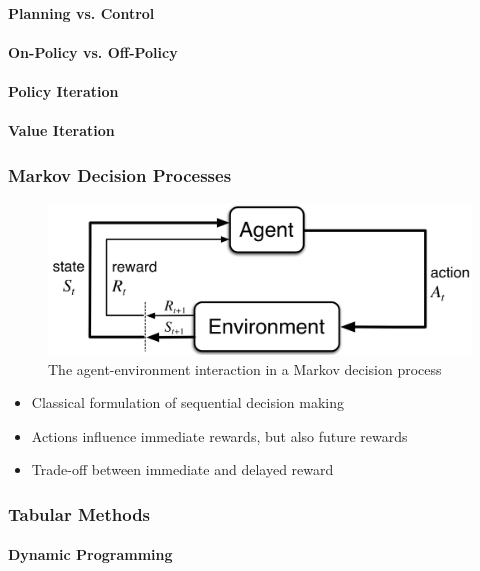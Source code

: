 \documentclass[12pt, article]{article}
\begin{document}
\paragraph{Planning vs. Control}
\label{sec:orgf5e8977}
\paragraph{On-Policy vs. Off-Policy}
\label{sec:org15d115c}
\paragraph{Policy Iteration}
\label{sec:orgbdf8eea}
\paragraph{Value Iteration}
\label{sec:org97c1be8}
\subsubsection{Markov Decision Processes}
\label{sec:orgfbc507c}

\begin{figure}[htbp]
\centering
\includegraphics[width=.9\linewidth]{./img/mdp_interaction.png}
\caption[Markov Decision Process]{The agent-environment interaction in a Markov decision process \parencite{sutton18_reinf}}
\end{figure}
\begin{itemize}
\item Classical formulation of sequential decision making
\item Actions influence immediate rewards, but also future rewards
\item Trade-off between immediate and delayed reward
\end{itemize}
\subsubsection{Tabular Methods}
\label{sec:org6bdeffe}
\paragraph{Dynamic Programming}
\label{sec:org6d207bd}
\end{document}
